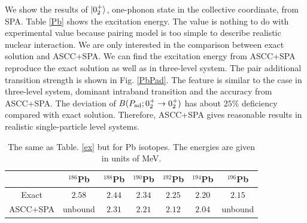 \documentclass[%
superscriptaddress,
showpacs,
nofootinbib,
amsmath,amssymb,
aps,
prc,
twocolumn,
floatfix ]%
{revtex4-1}
\begin{document}
We show the results of $\ket{0_2^+}$, one-phonon state in the collective coordinate, from SPA. Table \ref{Pb} shows the excitation energy. The value is nothing to do with experimental value because pairing model is too simple to describe realistic nuclear interaction. We are only interested in the comparison between exact solution and ASCC+SPA. We can find the excitation energy from ASCC+SPA reproduce the exact solution as well as in three-level system. The pair additional transition strength is shown in Fig. \ref{PbPad}. The feature is similar to the case in three-level system, dominant intraband transition and the accuracy from ASCC+SPA. The deviation of $B(P_{\rm ad};0_2^+\rightarrow 0_2^+)$ has about $25\%$ deficiency compared with exact solution. Therefore, ASCC+SPA gives reasonable results in realistic single-particle level systems. 
\begin{table}[htbp]
\begin{ruledtabular}
\begin{tabular}{c|cccccc}
   & ${}^{186}$Pb & ${}^{188}$Pb & ${}^{190}$Pb & ${}^{192}$Pb & ${}^{194}$Pb & ${}^{196}$Pb\\ \hline
 Exact & $2.58$ & $2.44$ & $2.34$ & $2.25$ & $2.20$ & $2.15$\\
ASCC+SPA & unbound & $2.31$ & $2.21$ & $2.12$ & $2.04$ & unbound \\ 
\end{tabular}
\end{ruledtabular}
\caption{The same as Table. \ref{ex} but for Pb isotopes. The energies are given in units of MeV.}
\label{Pb_ex}
\end{table}
\end{document}
